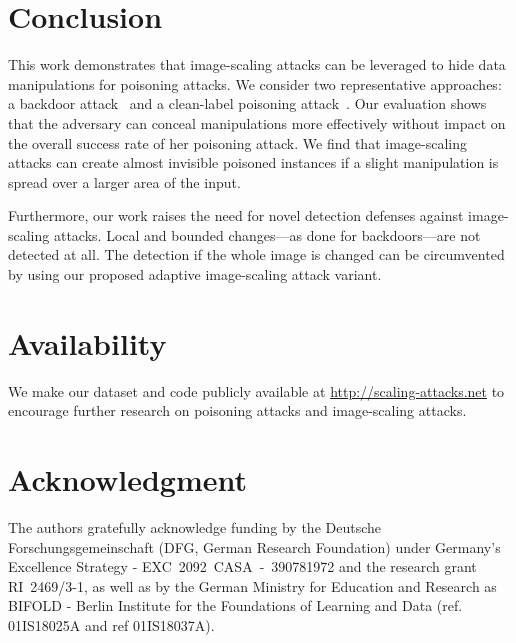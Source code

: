\documentclass[conference]{IEEEtran}
\begin{document}
\section{Conclusion}\label{sec:conclusion}
This work demonstrates that image-scaling attacks can be 
{leveraged\EndAccSupp{}} to hide data manipulations for poisoning attacks. We consider 
two representative approaches: a backdoor attack~\citep{GuDolGar17} and 
a clean-label poisoning attack~\citep{ShaHuaNaj+18}. Our evaluation 
shows that the adversary can conceal manipulations more effectively 
without impact on the overall success rate of her poisoning attack. 
We find that image-scaling attacks can create almost invisible poisoned 
instances if a slight manipulation is spread over a larger area of the 
input.


Furthermore, our work raises the need for novel detection defenses 
against image-scaling attacks. Local and bounded changes---as done for 
backdoors---are not detected at all. The detection if the whole image 
is changed can be circumvented by using our proposed adaptive 
image-scaling attack variant. 



\section*{Availability}
We make our dataset and code publicly available at 
\mbox{\url{http://scaling-attacks.net}} to encourage further research 
on poisoning attacks and image-scaling attacks.

\section*{Acknowledgment}
The authors gratefully acknowledge funding by the Deutsche 
Forschungsgemeinschaft (DFG, German Research Foundation) under 
Germany's Excellence Strategy - \mbox{EXC 2092 CASA - 390781972} and 
the research grant \mbox{RI 2469/3-1}, as well as by the German 
Ministry for Education and Research as BIFOLD - Berlin Institute for 
the Foundations of Learning and Data (ref. \mbox{01IS18025A} and ref 
\mbox{01IS18037A}).
\end{document}
